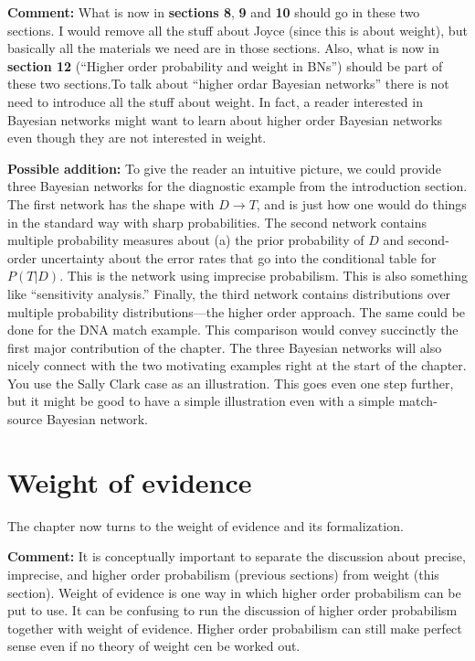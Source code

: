 \documentclass[
  10pt,
  dvipsnames,enabledeprecatedfontcommands]{scrartcl}
\begin{document}
\textbf{Comment:} What is now in \textbf{sections 8}, \textbf{9} and
\textbf{10} should go in these two sections. I would remove all the
stuff about Joyce (since this is about weight), but basically all the
materials we need are in those sections. Also, what is now in
\textbf{section 12} (``Higher order probability and weight in BNs'')
should be part of these two sections.To talk about ``higher ordar
Bayesian networks'' there is not need to introduce all the stuff about
weight. In fact, a reader interested in Bayesian networks might want to
learn about higher order Bayesian networks even though they are not
interested in weight.

\textbf{Possible addition:} To give the reader an intuitive picture, we
could provide three Bayesian networks for the diagnostic example from
the introduction section. The first network has the shape with
\(D \rightarrow T\), and is just how one would do things in the standard
way with sharp probabilities. The second network contains multiple
probability measures about (a) the prior probability of \(D\) and
second-order uncertainty about the error rates that go into the
conditional table for \(P(T | D)\). This is the network using imprecise
probabilism. This is also something like ``sensitivity analysis.''
Finally, the third network contains distributions over multiple
probability distributions---the higher order approach. The same could be
done for the DNA match example. This comparison would convey succinctly
the first major contribution of the chapter. The three Bayesian networks
will also nicely connect with the two motivating examples right at the
start of the chapter. You use the Sally Clark case as an illustration.
This goes even one step further, but it might be good to have a simple
illustration even with a simple match-source Bayesian network.

\hypertarget{weight-of-evidence}{%
\section{Weight of evidence}\label{weight-of-evidence}}


The chapter now turns to the weight of evidence and its formalization.

\textbf{Comment:} It is conceptually important to separate the
discussion about precise, imprecise, and higher order probabilism
(previous sections) from weight (this section). Weight of evidence is
one way in which higher order probabilism can be put to use. It can be
confusing to run the discussion of higher order probabilism together
with weight of evidence. Higher order probabilism can still make perfect
sense even if no theory of weight cen be worked out.
\end{document}
